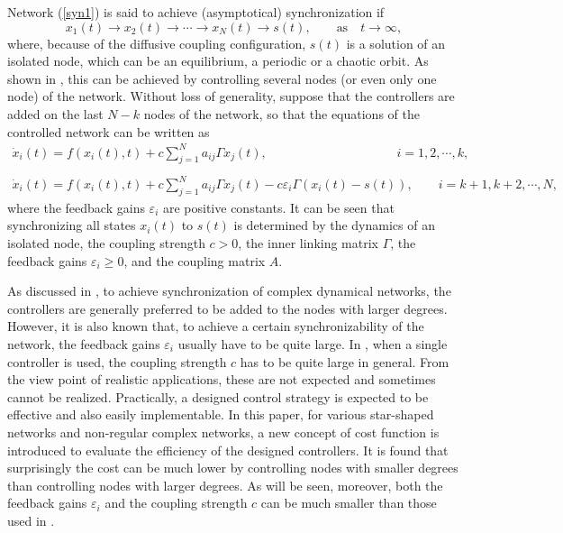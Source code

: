 \documentclass[11pt]{article}
\begin{document}
Network (\ref{syn1}) is said to achieve (asymptotical)
synchronization if
\begin{equation} \label{syn3}
x_1(t)\rightarrow
x_2(t)\rightarrow\cdots\rightarrow x_N(t)\rightarrow s(t),\qquad
\textrm{as}\quad t\rightarrow\infty,
\end{equation}
where, because of the diffusive coupling configuration, $s(t)$ is a
solution of an isolated node, which can be an equilibrium, a
periodic or a chaotic orbit. As shown in
\cite{jia53,r8,jia55,jia57}, this can be achieved by controlling
several nodes (or even only one node) of the network. Without loss
of generality, suppose that the controllers are added on the last
$N-k$ nodes of the network, so that the equations of the controlled
network can be written as
\begin{equation} \label{cost7}
 \begin{array}{l}
 \dot x_i(t)=f(x_i(t),t)+c\sum _{j=1}^{N}a_{ij}\Gamma
 x_j(t),\qquad\qquad\qquad\qquad\qquad\;
i=1,2,\cdots,k,\\
\\
 \dot x_i(t)=f(x_i(t),t)+c\sum_{j=1}^{N}a_{ij}\Gamma x_j(t)-c\varepsilon_i\Gamma(x_i(t)-s(t)),\qquad
i=k+1,k+2,\cdots,N,\end{array}
\end{equation}
where the feedback gains $\varepsilon_i$ are positive constants. It
can be seen that synchronizing all states $x_i(t)$ to $s(t)$ is
determined by the dynamics of an isolated node, the coupling
strength $c>0$, the inner linking matrix $\Gamma$, the feedback
gains $\varepsilon_i\geq0$, and the coupling matrix $A$.

As discussed in \cite{r8,jia55,jia57}, to achieve synchronization of
complex dynamical networks, the controllers are generally preferred
to be added to the nodes with larger degrees. However, it is also
known that, to achieve a certain synchronizability of the network,
the feedback gains $\varepsilon_i$ usually have to be quite large.
In \cite{jia53}, when a single controller is used, the coupling
strength $c$ has to be quite large in general. From the view point
of realistic applications, these are not expected and sometimes
cannot be realized. Practically, a designed control strategy is
expected to be effective and also easily implementable. In this
paper, for various star-shaped networks and non-regular complex
networks, a new concept of cost function is introduced to evaluate
the efficiency of the designed controllers. It is found that
surprisingly the cost can be much lower by controlling nodes with
smaller degrees than controlling nodes with larger degrees. As will
be seen, moreover, both the feedback gains $\varepsilon_i$ and the
coupling strength $c$ can be much smaller than those used in
\cite{jia53,r8,jia55,jia57}.
\end{document}
